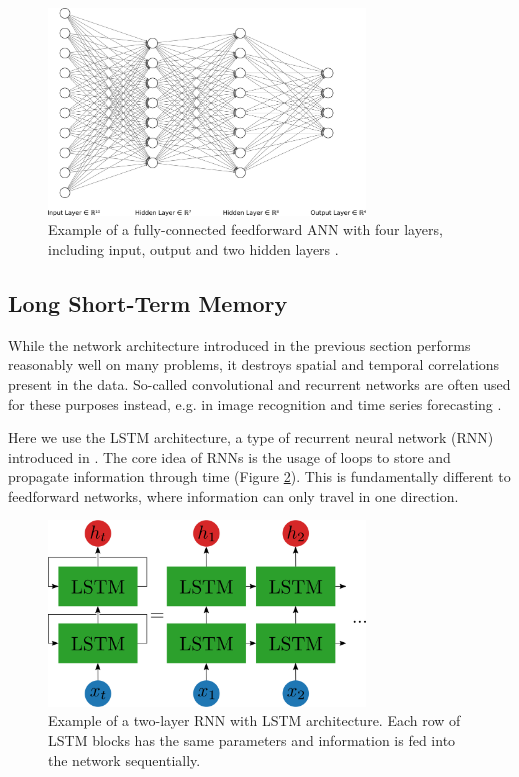 \begin{figure}[h]
	\centering
	\includegraphics[width=0.75\textwidth]{img/nn}
	\caption{Example of a fully-connected feedforward ANN with four layers, including input, output and two hidden layers \cite{LeNail2019}.}
	\label{nn}
\end{figure}

\subsection{Long Short-Term Memory}
While the network architecture introduced in the previous section performs reasonably well on many problems, it destroys spatial and temporal correlations present in the data. 
So-called convolutional and recurrent networks are often used for these purposes instead, e.g. in image recognition and time series forecasting \cite{10.1007/978-3-642-46466-9_18, 8614252}.

Here we use the LSTM architecture, a type of recurrent neural network (RNN) introduced in \cite{doi:10.1162/neco.1997.9.8.1735}. 
The core idea of RNNs is the usage of loops to store and propagate information through time (Figure \ref{rnn}).
This is fundamentally different to feedforward networks, where information can only travel in one direction.

\begin{figure}[ht]
	\centering
	\includegraphics[width=0.75\textwidth]{img/rnn}
	\caption{Example of a two-layer RNN with LSTM architecture. Each row of LSTM blocks has the same parameters and information is fed into the network sequentially.}
	\label{rnn}
\end{figure}

